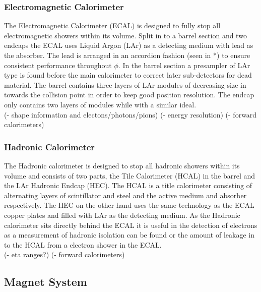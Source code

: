 		\subsubsection*{Electromagnetic Calorimeter}

		The Electromagnetic Calorimeter (ECAL) is designed to fully stop all electromagnetic showers within its volume. Split in to a barrel section and two endcaps the ECAL uses Liquid Argon (LAr) as a detecting medium with lead as the absorber. The lead is arranged in an accordion fashion (seen in *) to ensure consistent performance throughout $\phi$. In the barrel section a presampler of LAr type is found before the main calorimeter to correct later sub-detectors for dead material. The barrel contains three layers of LAr modules of decreasing size in towards the collision point in order to keep good position resolution. The endcap only contains two layers of modules while with a similar ideal.\\

		(- shape information and electons/photons/pions)
		(- energy resolution)
		(- forward calorimeters)

		\subsubsection*{Hadronic Calorimeter}

		The Hadronic calorimeter is designed to stop all hadronic showers within its volume and consists of two parts, the Tile Calorimeter (HCAL) in the barrel and the LAr Hadronic Endcap (HEC). The HCAL is a title calorimeter consisting of alternating layers of scintillator and steel and the active medium and absorber respectively. The HEC on the other hand uses the same technology as the ECAL copper plates and filled with LAr as the detecting medium. As the Hadronic calorimeter sits directly behind the ECAL it is useful in the detection of electrons as a measurement of hadronic isolation can be found or the amount of leakage in to the HCAL from a electron shower in the ECAL.\\
		(- eta ranges?)
		(- forward calorimeters)
		


	\subsection{Magnet System}

